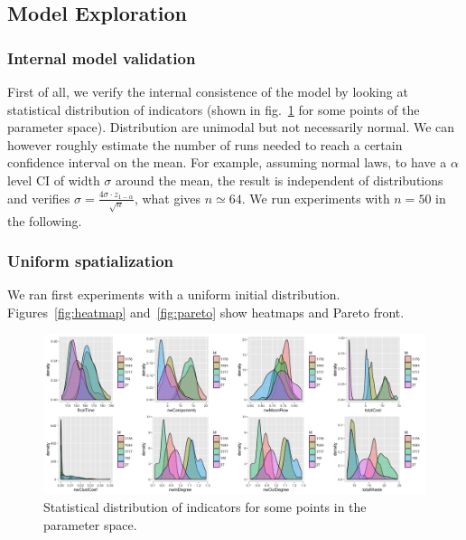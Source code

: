 \documentclass[fleqn,10pt]{wlscirep}
\begin{document}
{%
\subsection{Model Exploration}

\subsubsection{Internal model validation}

First of all, we verify the internal consistence of the model by looking at statistical distribution of indicators (shown in fig.~\ref{fig:stat-distrib} for some points of the parameter space). Distribution are unimodal but not necessarily normal. We can however roughly estimate the number of runs needed to reach a certain confidence interval on the mean. For example, assuming normal laws, to have a $\alpha$ level CI of width $\sigma$ around the mean, the result is independent of distributions and verifies $\sigma = \frac{4\sigma \cdot z_{1-\alpha}}{\sqrt{n}}$, what gives $n\simeq 64$. We run experiments with $n=50$ in the following.


\subsubsection{Uniform spatialization}

We ran first experiments with a uniform initial distribution. Figures~\ref{fig:heatmap} and~\ref{fig:pareto} show heatmaps and Pareto front.





\begin{figure}
\hspace{-2cm}\includegraphics[width=1.3\textwidth]{figures/indics_distrib.png}
\caption{Statistical distribution of indicators for some points in the parameter space.}
\label{fig:stat-distrib}
\end{figure}

}
\end{document}
